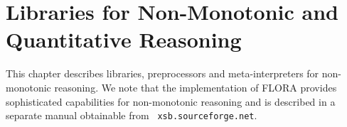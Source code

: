 \chapter{Libraries for Non-Monotonic and Quantitative Reasoning} \label{library_nmr}

This chapter describes libraries, preprocessors and meta-interpreters
for non-monotonic reasoning.  We note that the implementation of FLORA
 provides sophisticated capabilities for non-monotonic
reasoning and is described in a separate manual obtainable from {\tt
xsb.sourceforge.net}.



